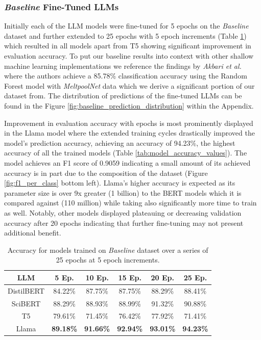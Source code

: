 \subsubsection{\textit{Baseline} Fine-Tuned LLMs}
Initially each of the LLM models were fine-tuned for 5 epochs on the
\textit{Baseline} dataset and further extended to 25 epochs with 5 epoch
increments (Table \ref{tab:model_accuracy_values_per_epoch}) which resulted in
all models apart from T5 showing significant improvement in evaluation accuracy.
To put our baseline results into context with other shallow machine learning
implementations we reference the findings by \textit{Akbari et al.}
\cite{akbari_meltpoolnet_2022} where the authors achieve a 85.78\%
classification accuracy using the Random Forest model with \textit{MeltpoolNet}
data which we derive a significant portion of our dataset from. The distribution
of predictions of the fine-tuned LLMs can be found in the Figure
\ref{fig:baseline_prediction_distribution} within the Appendix.

Improvement in evaluation accuracy with epochs is most prominently displayed in
the Llama model where the extended training cycles drastically improved the
model's prediction accuracy, achieving an accuracy of 94.23\%, the highest
accuracy of all the trained models (Table \ref{tab:model_accuracy_values}). The
model achieves an F1 score of 0.9059 indicating a small amount of its achieved
accuracy is in part due to the composition of the dataset (Figure
\ref{fig:f1_per_class} bottom left). Llama's higher accuracy is expected as its
parameter size is over 9x greater (1 billion) to the BERT models which it is
compared against (110 million) while taking also significantly more time to
train as well. Notably, other models displayed plateauing or decreasing
validation accuracy after 20 epochs indicating that further fine-tuning may not
present additional benefit.

\begin{table}[h!]
\centering
\begin{tabular}{|c|c|c|c|c|c|}
\hline
\textbf{LLM}    & \textbf{5 Ep.} & \textbf{10 Ep.}    & \textbf{15 Ep.}    & \textbf{20 Ep.}    & \textbf{25 Ep.}   \\ \hline
DistilBERT      & 84.22\%           & 87.75\%               & 87.75\%               & 88.29\%               & 88.41\%              \\ \hline
SciBERT         & 88.29\%           & 88.93\%               & 88.99\%               & 91.32\%               & 90.88\%              \\ \hline
T5              & 79.61\%           & 71.45\%               & 76.42\%               & 77.92\%               & 71.41\%              \\ \hline
Llama           & \textbf{89.18\%}  & \textbf{91.66\%}      & \textbf{92.94\%}      & \textbf{93.01\%}      & \textbf{94.23\%}     \\ \hline
\end{tabular}
\caption{
    Accuracy for models trained on \textit{Baseline} dataset over a series of
    25 epochs at 5 epoch increments.
}
\label{tab:model_accuracy_values_per_epoch}
\end{table}

